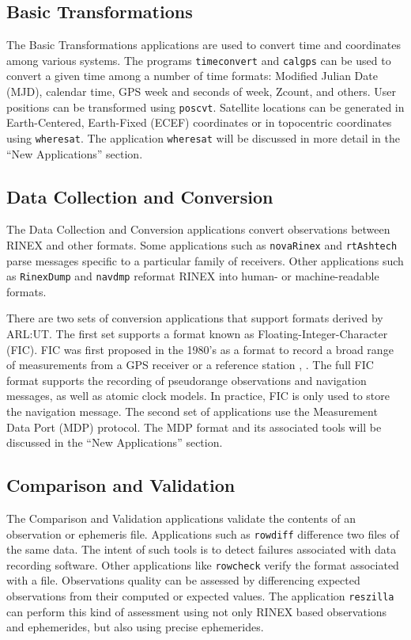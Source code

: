 \documentclass{ion-gps}
\newcommand{\gpstkapplication}[1]{\texttt{#1}}
\begin{document}
\subsection*{Basic Transformations}
The Basic Transformations applications are used to convert time and coordinates among
various systems. The programs \gpstkapplication{timeconvert} and
\gpstkapplication{calgps} can be used to convert a given time among a
number of time formats: Modified Julian Date (MJD), calendar time, GPS
week and seconds of week, Zcount, and others. User positions can
be transformed using \gpstkapplication{poscvt}. Satellite locations
can be generated in Earth-Centered, Earth-Fixed (ECEF) coordinates or
in topocentric coordinates using \gpstkapplication{wheresat}. The
application \gpstkapplication{wheresat} will be discussed in more detail 
in the ``New Applications'' section.

\subsection*{Data Collection and Conversion}

The Data Collection and Conversion applications convert 
observations between RINEX and other formats. Some applications 
such as \gpstkapplication{novaRinex}
and \gpstkapplication{rtAshtech} parse messages specific to a
particular family of receivers. Other applications such as
\gpstkapplication{RinexDump} and \gpstkapplication{navdmp}
reformat RINEX into human- or machine-readable formats.

There are two sets of conversion applications that support formats
derived by ARL:UT.  The first set supports a format known as
Floating-Integer-Character (FIC). FIC was first proposed in the 1980's
as a format to record a broad range of measurements from a GPS receiver or
a reference station \cite{rinex1format}, \cite{ficproposal}. The full
FIC format supports the recording of pseudorange observations and
navigation messages, as well as atomic clock models. In practice, FIC is only used to store the
navigation message. The second set of applications use
the Measurement Data Port (MDP) protocol. The MDP format and its
associated tools will be discussed in the ``New
Applications'' section.

\subsection*{Comparison and Validation}
The Comparison and Validation applications validate the contents of an observation or 
ephemeris file. Applications such as \gpstkapplication{rowdiff} 
difference two files of the same data. The intent of such tools 
is to detect failures associated with data recording software. 
Other applications like \gpstkapplication{rowcheck} verify the 
format associated with a file. Observations quality can be assessed 
by differencing expected observations from their computed or expected 
values. The application \gpstkapplication{reszilla} can perform 
this kind of assessment using not only RINEX based observations and 
ephemerides, but also using precise ephemerides. 
\end{document}
